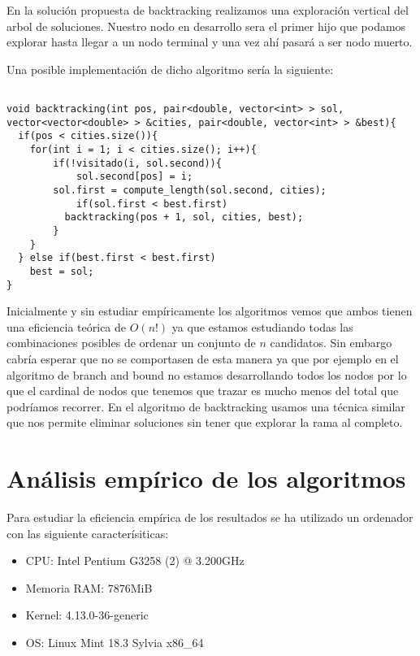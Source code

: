 \documentclass{article}
\begin{document}
En la solución propuesta de backtracking realizamos una exploración
vertical del arbol de soluciones. Nuestro nodo en desarrollo sera el
primer hijo que podamos explorar hasta llegar a un nodo terminal y una
vez ahí pasará a ser nodo muerto.

Una posible implementación de dicho algoritmo sería la siguiente:

\begin{lstlisting}
  
void backtracking(int pos, pair<double, vector<int> > sol, vector<vector<double> > &cities, pair<double, vector<int> > &best){
  if(pos < cities.size()){
    for(int i = 1; i < cities.size(); i++){
  		if(!visitado(i, sol.second)){
  			sol.second[pos] = i;
        sol.first = compute_length(sol.second, cities);
  			if(sol.first < best.first)
          backtracking(pos + 1, sol, cities, best);
    	}
    }
  } else if(best.first < best.first)
    best = sol;
}

\end{lstlisting}

Inicialmente y sin estudiar empíricamente los algoritmos vemos que
ambos tienen una eficiencia teórica de $O(n!)$ ya que estamos
estudiando todas las combinaciones posibles de ordenar un conjunto de
$n$ candidatos. Sin embargo cabría esperar que no se comportasen de
esta manera ya que por ejemplo en el algoritmo de branch and bound no
estamos desarrollando todos los nodos por lo que el cardinal de nodos
que tenemos que trazar es mucho menos del total que podríamos
recorrer. En el algoritmo de backtracking usamos una técnica similar
que nos permite eliminar soluciones sin tener que explorar la rama al
completo.

\section{Análisis empírico de los algoritmos}

Para estudiar la eficiencia empírica de los resultados se ha utilizado
un ordenador con las siguiente caracterísiticas:

\begin{itemize}
\item CPU: Intel Pentium G3258 (2) @ 3.200GHz
\item Memoria RAM: 7876MiB
\item Kernel: 4.13.0-36-generic
\item OS: Linux Mint 18.3 Sylvia x86\_64
\end{itemize}
\end{document}
